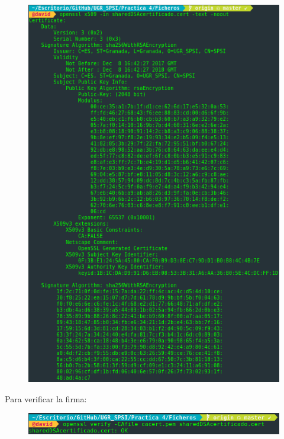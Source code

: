 \documentclass[10pt,a4paper,spanish]{report}
\begin{document}
\begin{figure}[!hbp]
 \centering  \includegraphics[width=1\textwidth]{./Imagenes/6_6.png}
\end{figure}

\noindent
Para verificar la firma:

\begin{figure}[!hbp]
 \centering  \includegraphics[width=1\textwidth]{./Imagenes/6_7.png}
\end{figure}

\end{document}

